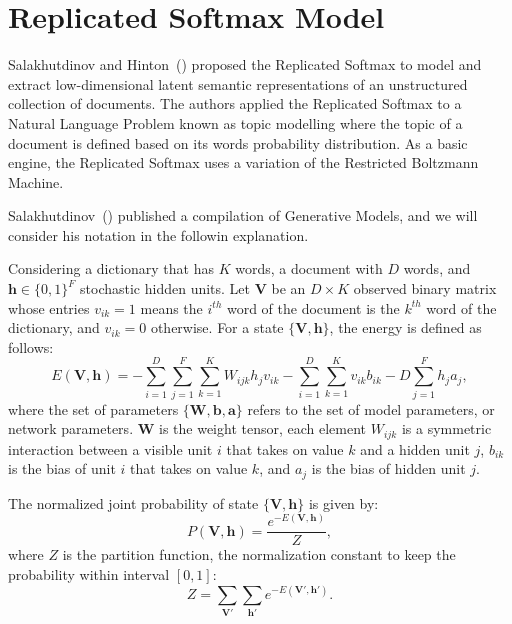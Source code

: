 \section{Replicated Softmax Model}%
\label{app:rsm}%
%
Salakhutdinov and Hinton~(\citeyear{bib:salakhutdinov-hinton2009}) proposed the Replicated Softmax to model and extract low-dimensional latent semantic representations of an unstructured collection of documents.
The authors applied the Replicated Softmax to a Natural Language Problem known as topic modelling where the topic of a document is defined based on its words probability distribution.
As a basic engine, the Replicated Softmax uses a variation of the Restricted Boltzmann Machine.

Salakhutdinov~(\citeyear{bib:salakhutdinov2015}) published a compilation of Generative Models, and we will consider his notation in the followin explanation.

Considering a dictionary that has $K$ words, a document with $D$ words, and $\mathbf{h} \in {\{0, 1\}}^{F}$ stochastic hidden units.
Let $\mathbf{V}$ be an $D \times K$ observed binary matrix whose entries $v_{ik} = 1$ means the $i^{th}$ word of the document is the $k^{th}$ word of the dictionary, and $v_{ik} = 0$ otherwise.
For a state ${\{\mathbf{V}, \mathbf{h}\}}$, the energy is defined as follows:
\begin{equation}
    \label{eq:app:rsm-energy-Vh}
    E(\mathbf{V}, \mathbf{h}) = - \sum^{D}_{i = 1} \sum^{F}_{j = 1} \sum^{K}_{k = 1} W_{ijk} h_{j} v_{ik} - \sum^{D}_{i = 1} \sum^{K}_{k = 1} v_{ik} b_{ik} - D\sum^{F}_{j = 1} h_{j} a_{j},
\end{equation}
where the set of parameters $\{\mathbf{W}, \mathbf{b}, \mathbf{a}\}$ refers to the set of model parameters, or network parameters.
$\mathbf{W}$ is the weight tensor, each element $W_{ijk}$ is a symmetric interaction between a visible unit $i$ that takes on value $k$ and a hidden unit $j$, $b_{ik}$ is the bias of unit $i$ that takes on value $k$, and $a_{j}$ is the bias of hidden unit $j$.

The normalized joint probability of state ${\{\mathbf{V}, \mathbf{h}\}}$ is given by:
\begin{equation}
    \label{eq:app:rsm-joint-prob}
    P(\mathbf{V}, \mathbf{h}) = \frac{e^{-E(\mathbf{V}, \mathbf{h})}}{Z},
\end{equation}
where $Z$ is the partition function, the normalization constant to keep the probability within interval $[0, 1]$:
\begin{equation}
    \label{eq:app:rsm-partition-func}
    Z = \sum_{\mathbf{V}'} \sum_{\mathbf{h}'} e^{-E(\mathbf{V}', \mathbf{h}')}.
\end{equation}

